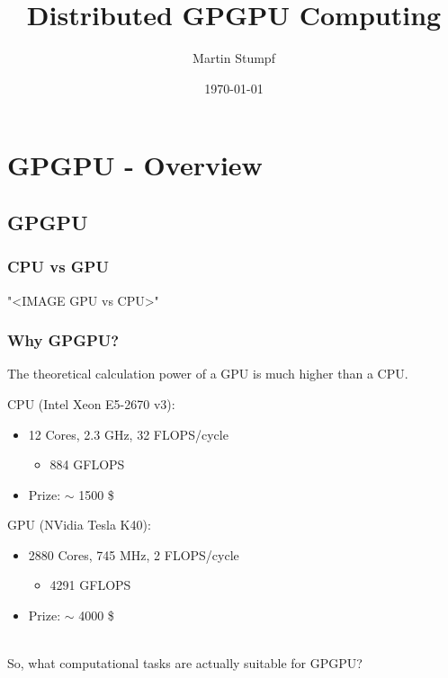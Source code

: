 \documentclass{beamer}
\title{Distributed GPGPU Computing}
\author{Martin Stumpf}
\institute{Ste||ar Group, LSU}
\date{\today}
\begin{document}
\frame{\titlepage}

\section{GPGPU - Overview}


\subsection{GPGPU}

\begin{frame}
    \frametitle{CPU vs GPU}
    "<IMAGE GPU vs CPU>"
\end{frame}

\begin{frame}
    \frametitle{Why GPGPU?}

    The \alert{theoretical} calculation power of a GPU is much higher
    than a CPU.

    \begin{example}
        CPU (Intel Xeon E5-2670 v3):
        \begin{itemize}
            \item 12 Cores, 2.3 GHz, 32 FLOPS/cycle
            \begin{itemize}
                \item \alert{884 GFLOPS}
            \end{itemize}
            \item Prize: $\sim$ \alert{1500} \$
        \end{itemize}
        GPU (NVidia Tesla K40):
        \begin{itemize}
            \item 2880 Cores, 745 MHz, 2 FLOPS/cycle
            \begin{itemize}
                \item \alert{4291 GFLOPS}
            \end{itemize}
            \item Prize: $\sim$ \alert{4000} \$
        \end{itemize}
    \end{example}
    ~\\
    So, what computational tasks are actually suitable for GPGPU?
\end{frame}
\end{document}
